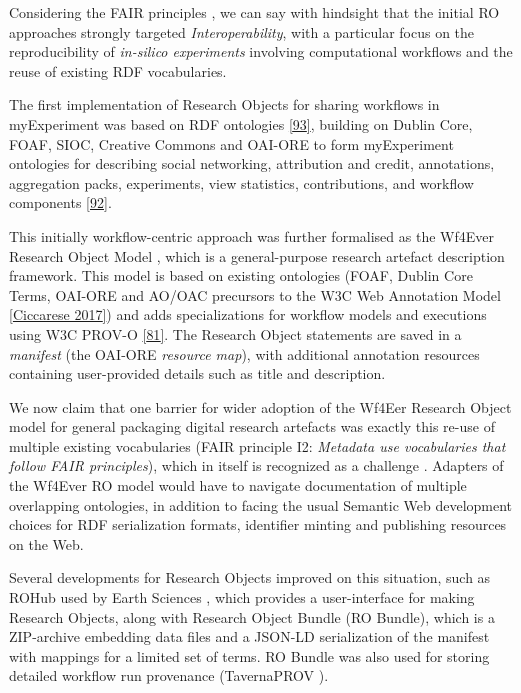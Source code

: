 {Considering the FAIR principles
\cite{ch5-123}, we can say with
hindsight that the initial RO approaches strongly targeted
\emph{Interoperability}, with a particular focus on the reproducibility
of \emph{in-silico experiments} involving computational workflows and
the reuse of existing RDF vocabularies.

The first implementation of Research Objects for sharing workflows in
myExperiment \cite{ch5-57} was
based on RDF ontologies
\href{http://ceur-ws.org/Vol-523/Newman.pdf}{{[}93{]}}, building on
Dublin Core, FOAF, SIOC, Creative Commons and OAI-ORE to form
myExperiment ontologies for describing social networking, attribution
and credit, annotations, aggregation packs, experiments, view
statistics, contributions, and workflow components
\href{https://web.archive.org/web/20091115080336/http\%3a\%2f\%2frdf.myexperiment.org/ontologies}{{[}92{]}}.

This initially workflow-centric approach was further formalised as the
Wf4Ever Research Object Model
\cite{Belhajjame 2015}, which is
a general-purpose research artefact description framework. This model is
based on existing ontologies (FOAF, Dublin Core Terms, OAI-ORE and
AO/OAC precursors to the W3C Web Annotation Model
\href{https://www.w3.org/TR/2017/REC-annotation-model-20170223/}{{[}Ciccarese 2017{]}})
and adds specializations for workflow models and executions using W3C
PROV-O \href{https://www.w3.org/TR/2013/REC-prov-o-20130430/}{{[}81{]}}.
The Research Object statements are saved in a \emph{manifest} (the
OAI-ORE \emph{resource map}), with additional annotation resources
containing user-provided details such as title and description.

We now claim that one barrier for wider adoption of the Wf4Eer Research
Object model for general packaging digital research artefacts was
exactly this re-use of multiple existing vocabularies (FAIR principle
I2: \emph{Metadata use vocabularies that follow FAIR principles}), which
in itself is recognized as a challenge
\cite{ch5-67}. Adapters
of the Wf4Ever RO model would have to navigate documentation of multiple
overlapping ontologies, in addition to facing the usual Semantic Web
development choices for RDF serialization formats, identifier minting
and publishing resources on the Web.

Several developments for Research Objects improved on this situation,
such as ROHub used by Earth Sciences
\cite{ch5-48}, which provides a
user-interface for making Research Objects, along with Research Object
Bundle \cite{ch5-111} (RO
Bundle), which is a ZIP-archive embedding data files and a JSON-LD
serialization of the manifest with mappings for a limited set of terms.
RO Bundle was also used for storing detailed workflow run provenance
(TavernaPROV
\cite{ch5-110}).

}
